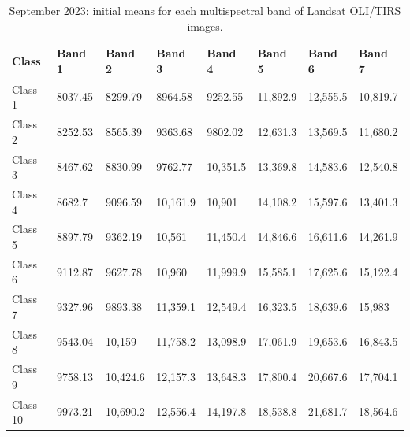 \documentclass[geomatics,article,accept,pdftex,oneauthor]{Definitions/mdpi}
\begin{document}
\begin{table}[H]
\caption{September 2023: initial means for each multispectral band of Landsat OLI/TIRS images.}\label{tabA05}
\begin{tabularx}{\textwidth}{ p{1.5cm} X X X X X X X }
\toprule \textbf{Class} & \textbf{Band 1} & \textbf{Band 2} & \textbf{Band 3} & \textbf{Band 4} & \textbf{Band 5} & \textbf{Band 6} & \textbf{Band 7} \\  \midrule
    Class 1 & 8037.45 & 8299.79 & 8964.58 & 9252.55 & 11,892.9 & 12,555.5 & 10,819.7 \\
    Class 2 & 8252.53 & 8565.39 & 9363.68 & 9802.02 & 12,631.3 & 13,569.5 & 11,680.2 \\
    Class 3 & 8467.62 & 8830.99 & 9762.77 & 10,351.5 & 13,369.8 & 14,583.6 & 12,540.8 \\
    Class 4 & 8682.7 & 9096.59 & 10,161.9 & 10,901 & 14,108.2 & 15,597.6 & 13,401.3 \\
    Class 5 & 8897.79 & 9362.19 & 10,561 & 11,450.4 & 14,846.6 & 16,611.6 & 14,261.9 \\
    Class 6 & 9112.87 & 9627.78 & 10,960 & 11,999.9 & 15,585.1 & 17,625.6 & 15,122.4 \\
    Class 7 & 9327.96 & 9893.38 & 11,359.1 & 12,549.4 & 16,323.5 & 18,639.6 & 15,983 \\
    Class 8 & 9543.04 & 10,159 & 11,758.2 & 13,098.9 & 17,061.9 & 19,653.6 & 16,843.5 \\
    Class 9 & 9758.13 & 10,424.6 & 12,157.3 & 13,648.3 & 17,800.4 & 20,667.6 & 17,704.1 \\
    Class 10 & 9973.21 & 10,690.2 & 12,556.4 & 14,197.8 & 18,538.8 & 21,681.7 & 18,564.6 \\
    \bottomrule
\end{tabularx}
\label{tabA05}
\end{table}
\vspace{-6pt}
\end{document}
